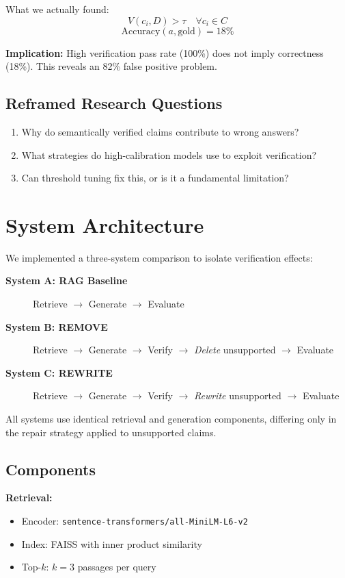 \documentclass[11pt]{article}
\begin{document}
What we actually found:
\[
V(c_i, D) > \tau \quad \forall c_i \in C
\]
\vspace{-0.5em}
\[
\text{Accuracy}(a, \text{gold}) = 18\%
\]

\textbf{Implication:} High verification pass rate (100\%) does not imply correctness (18\%). This reveals an 82\% false positive problem.

\subsection{Reframed Research Questions}

\begin{enumerate}
\item Why do semantically verified claims contribute to wrong answers?
\item What strategies do high-calibration models use to exploit verification?
\item Can threshold tuning fix this, or is it a fundamental limitation?
\end{enumerate}

\section{System Architecture}

We implemented a three-system comparison to isolate verification effects:

\begin{description}
\item[\textbf{System A: RAG Baseline}] Retrieve $\to$ Generate $\to$ Evaluate
\item[\textbf{System B: REMOVE}] Retrieve $\to$ Generate $\to$ Verify $\to$ \textit{Delete} unsupported $\to$ Evaluate
\item[\textbf{System C: REWRITE}] Retrieve $\to$ Generate $\to$ Verify $\to$ \textit{Rewrite} unsupported $\to$ Evaluate
\end{description}

All systems use identical retrieval and generation components, differing only in the repair strategy applied to unsupported claims.

\subsection{Components}

\textbf{Retrieval:}
\begin{itemize}
\item Encoder: \texttt{sentence-transformers/all-MiniLM-L6-v2}
\item Index: FAISS with inner product similarity
\item Top-$k$: $k=3$ passages per query
\end{itemize}
\end{document}

